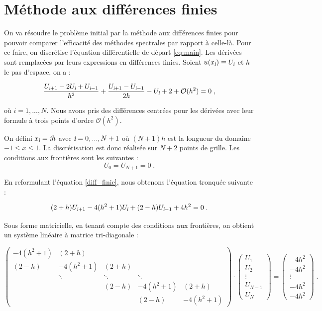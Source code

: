 \documentclass{report}
\begin{document}
\section{Méthode aux différences finies}

On va résoudre le problème initial par la méthode aux différences finies pour pouvoir comparer l'efficacité des méthodes spectrales par rapport à celle-là. Pour ce faire, on discrétise l'équation différentielle de départ \eqref{eq:main}. Les dérivées sont remplacées par leurs expressions en différences finies. Soient $u(x_{\textsl{i}}) \equiv U_{\textsl{i}}$ et $h$ le pas d'espace, on a :

\begin{equation}
\frac{U_{\textsl{i}+1} - 2 U_{\textsl{i}} + U_{\textsl{i}-1}}{h^2} + \frac{U_{\textsl{i}+1} - U_{\textsl{i}-1}}{2h} - U_{\textsl{i}} +2 + \mathcal{O}(h^2) = 0\;,\label{diff_finie}
\end{equation}

où $i = 1,...,N$. Nous avons pris des différences centrées pour les dérivées avec leur formule à trois points d'ordre $\mathcal{O}(h^2)$. 

On défini $x_{\textsl{i}}=\textsl{i}h$ avec $\textsl{i} = 0,...,N+1$ où $(N+1)h$ est la longueur du domaine $-1\leq x \leq 1$. La discrétisation est donc réalisée sur $N+2$ points de grille. Les conditions aux frontières sont les suivantes :
\begin{equation}
U_{0}=U_{N+1}=0\;.
\end{equation}

En reformulant l'équation \eqref{diff_finie}, nous obtenons l'équation tronquée suivante :

\begin{equation}
(2+h)U_{\textsl{i}+1}-4(h^2+1)U_{\textsl{i}}+(2-h)U_{\textsl{i}-1}+4h^2=0\;.
\end{equation}

Sous forme matricielle, en tenant compte des conditions aux frontières, on obtient un système linéaire à matrice tri-diagonale :

\begin{equation}
\begin{pmatrix}
-4(h^2+1) & (2+h) &  &  & \\ 
 (2-h) & -4(h^2+1) & (2+h) &  & \\ 
 & \ddots & \ddots & \ddots & \\ 
 &  & (2-h) & -4(h^2+1) & (2+h)\\ 
 &  &  & (2-h) & -4(h^2+1)
\end{pmatrix} \cdot \begin{pmatrix}
 U_{1}\\ 
 U_{2}\\ 
 \vdots\\ 
 U_{N-1}\\ 
 U_{N}
\end{pmatrix} =
\begin{pmatrix}
 -4h^2\\ 
 -4h^2\\ 
 \vdots\\ 
 -4h^2\\ 
 -4h^2
\end{pmatrix}\;.
\end{equation}
\end{document}
